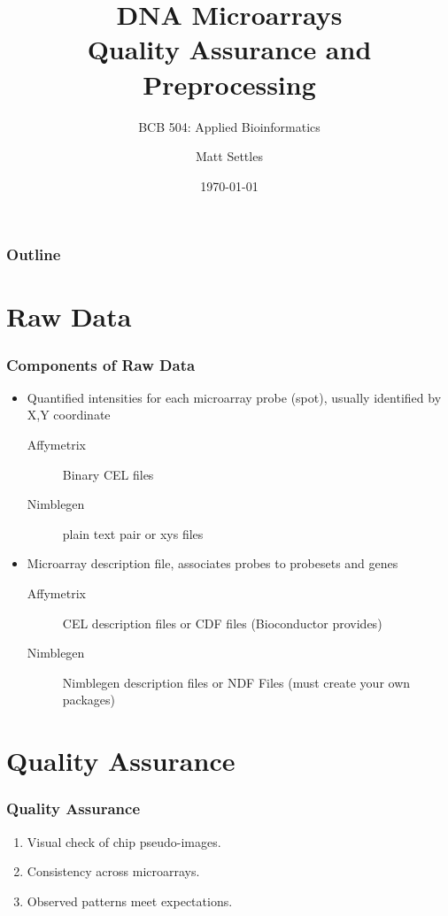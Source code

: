 \documentclass[pdf]{beamer}
\begin{document}
\title[Quality Assurance and Preprocessing]{DNA Microarrays\\Quality Assurance and Preprocessing\\}
\subtitle{BCB 504: Applied Bioinformatics\\}
\author[Matt Settles]{Matt Settles}
\date{\today}


\begin{frame}[plain]
  \titlepage
\end{frame}


\begin{frame}[plain] 
  \frametitle{Outline}
  \tableofcontents
\end{frame}

\section{Raw Data}
\begin{frame} 
  \frametitle{Components of Raw Data}
  \begin{itemize}
    \item Quantified intensities for each microarray probe (spot), usually identified by X,Y coordinate
    \begin{description}
      \item[Affymetrix] Binary CEL files
      \item[Nimblegen] plain text pair or xys files
    \end{description}
    \item Microarray description file, associates probes to probesets and genes
    \begin{description}
      \item[Affymetrix] CEL description files or CDF files (Bioconductor provides)
      \item[Nimblegen] Nimblegen description files or NDF Files (must create your own packages)
    \end{description}
  \end{itemize}
\end{frame}

%
\section{Quality Assurance}
\begin{frame}
  \frametitle{Quality Assurance}
  \begin{enumerate}
    \item Visual check of chip pseudo-images.
    \item Consistency across microarrays.
    \item Observed patterns meet expectations.
  \end{enumerate}
\end{frame}
\end{document}
